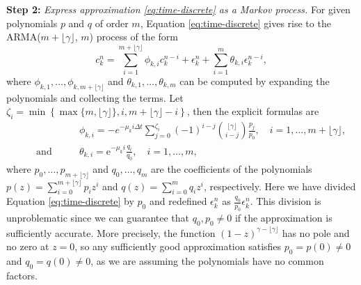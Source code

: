 \documentclass[12pt]{article} %
\newcommand{\cb}{\color{blue}}
\begin{document}
\noindent \textbf{Step 2:} {\em Express approximation \eqref{eq:time-discrete} as a Markov process.} For given polynomials $p$ and $q$ of order $m$, Equation \eqref{eq:time-discrete} gives rise to the ARMA($m+\lfloor\gamma\rfloor$, $m$) process of the form
\[
    c_k^n= \sum_{i = 1}^{m+\lfloor\gamma\rfloor}\phi_{k,i}c_k^{n-i}+ \epsilon_k^n+\sum_{i=1}^m \theta_{k,i} \epsilon_{k}^{n-i},
\]
where $\phi_{k,1}, \ldots, \phi_{k,m+\lfloor\gamma\rfloor}$ and $\theta_{k,1}, \ldots, \theta_{k,m}$ can be computed by expanding the polynomials and collecting the terms. Let $\zeta_i = \min\left\{\max\{m, \lfloor\gamma\rfloor\}, i, m+\lfloor\gamma\rfloor-i\right\}$, then the explicit formulas are
\begin{align*}
    & \qquad \phi_{k,i} = -e^{-\mu_k i \Delta t}\sum_{j = 0}^{\zeta_i}(-1)^{i-j} \binom{\lfloor \gamma\rfloor}{i-j} \frac{p_j}{p_0},\quad i = 1, \ldots, m+\lfloor\gamma\rfloor,\\
    \qquad\mathrm{and} & \qquad\theta_{k,i} = \mathrm{e}^{-\mu_k i}\frac{q_i}{q_0},\quad i = 1, \ldots, m,
\end{align*}
where $p_0, \ldots, p_{m+\lfloor\gamma\rfloor}$ and $q_0, \ldots, q_m$ are the coefficients of the polynomials $p(z) =\sum_{i=0}^{m+\lfloor\gamma\rfloor}p_{i} z^{i}$ and $q(z)=\sum_{i=0}^mq_{i} z^{i}$, respectively. Here we have divided Equation \eqref{eq:time-discrete} by $p_0$ and redefined $\epsilon_k^n$ as $\frac{q_0}{p_0}\epsilon_k^n$. This division is unproblematic since we can guarantee that $q_0,p_0 \neq 0$ if the approximation is sufficiently accurate. More precisely, the function $(1-z)^{\gamma - \lfloor \gamma \rfloor}$ has no pole and no zero at $z = 0$, so any sufficiently good approximation satisfies $p_0 = p(0) \neq 0$ and $q_0 = q(0) \neq 0$, as we are assuming the polynomials have no common factors. 
\end{document}
